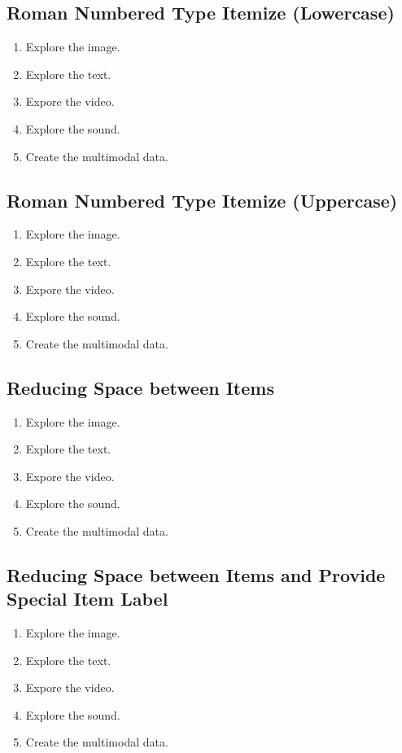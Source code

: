 \documentclass[11pt]{article}
\begin{document}
{\subsection{Roman Numbered Type Itemize (Lowercase)}
\begin{enumerate}[i]
\item Explore the image.
\item Explore the text.
\item Expore the video.
\item Explore the sound.
\item Create the multimodal data.
\end{enumerate}

\subsection{Roman Numbered Type Itemize (Uppercase)}
\begin{enumerate}[I]
\item Explore the image.
\item Explore the text.
\item Expore the video.
\item Explore the sound.
\item Create the multimodal data.
\end{enumerate}

\subsection{Reducing Space between Items}
\begin{enumerate}[nosep]
\item Explore the image.
\item Explore the text.
\item Expore the video.
\item Explore the sound.
\item Create the multimodal data.
\end{enumerate}

\subsection{Reducing Space between Items and Provide Special Item Label}
\begin{enumerate}[nosep, label=*]
\item Explore the image.
\item Explore the text.
\item Expore the video.
\item Explore the sound.
\item Create the multimodal data.
\end{enumerate}

}
\end{document}
